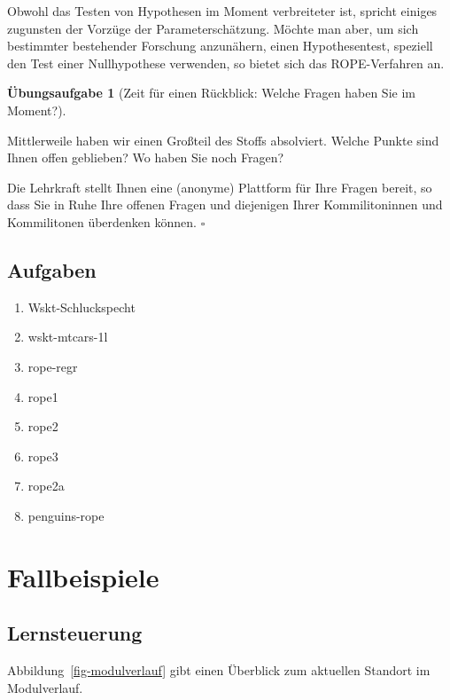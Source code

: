 \documentclass[
  ngerman,
  letterpaper,
  twoside,
  open=any]{scrbook}
\providecommand{\tightlist}{%
  \setlength{\itemsep}{0pt}\setlength{\parskip}{0pt}}\usepackage{longtable,booktabs,array}
\theoremstyle{definition}
\theoremstyle{plain}
\theoremstyle{definition}
\newtheorem{exercise}{Übungsaufgabe}[chapter]
\theoremstyle{definition}
\theoremstyle{definition}
\theoremstyle{definition}
\newtheorem{exercise}{Übungsaufgabe}[chapter]
\theoremstyle{remark}
\begin{document}
Obwohl das Testen von Hypothesen im Moment verbreiteter ist, spricht
einiges zugunsten der Vorzüge der Parameterschätzung. Möchte man aber,
um sich bestimmter bestehender Forschung anzunähern, einen
Hypothesentest, speziell den Test einer Nullhypothese verwenden, so
bietet sich das ROPE-Verfahren an.

\begin{exercise}[Zeit für einen Rückblick: Welche Fragen haben Sie im
Moment?]\protect\hypertarget{exr-fragjetzt-schaetzen}{}\label{exr-fragjetzt-schaetzen}

Mittlerweile haben wir einen Großteil des Stoffs absolviert. Welche
Punkte sind Ihnen offen geblieben? Wo haben Sie noch Fragen?

Die Lehrkraft stellt Ihnen eine (anonyme) Plattform für Ihre Fragen
bereit, so dass Sie in Ruhe Ihre offenen Fragen und diejenigen Ihrer
Kommilitoninnen und Kommilitonen überdenken können. \(\square\)

\end{exercise}

\section{Aufgaben}\label{aufgaben-9}

\begin{enumerate}
\def\labelenumi{\arabic{enumi}.}
\tightlist
\item
  Wskt-Schluckspecht
\item
  wskt-mtcars-1l
\item
  rope-regr
\item
  rope1
\item
  rope2
\item
  rope3
\item
  rope2a
\item
  penguins-rope
\end{enumerate}

\chapter{Fallbeispiele}\label{fallbeispiele}

\section{Lernsteuerung}\label{lernsteuerung-10}

Abbildung~\ref{fig-modulverlauf} gibt einen Überblick zum aktuellen
Standort im Modulverlauf.
\end{document}
